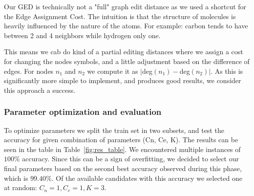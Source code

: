 \documentclass[12pt]{article}
\begin{document}
Our GED is technically not a "full" graph edit distance as we used a shortcut for the Edge Assignment Cost. The intuition is that the structure of molecules is heavily influenced by the nature of the atoms. For example: carbon tends to have between 2 and 4 neighbors while hydrogen only one.

This means we cab do kind of a partial editing distances where we assign a cost for changing the nodes symbols, and a little adjustment based on the difference of edges. For nodes $n_1$ and $n_2$ we compute it as $|$deg$(n_1) - $deg$(n_2)|$. As this is significantly more simple to implement, and produces good results, we consider this approach a success.

\subsubsection*{Parameter optimization and evaluation}

To optimize parameters we split the train set in two subsets, and test the accuracy for given combination of parameters (Cn, Ce, K).
The results can be seen in the table in Table~\ref{fig:res_table}. We encountered multiple instances of $100\%$ accuracy. Since this can be a sign of overfitting, we decided to select
our final parameters based on the second best accuracy observed during this phase, which is $99.40\%$. Of the available candidates with this accuracy we selected one at random: $C_n = 1, C_e = 1, K = 3$.
\end{document}
